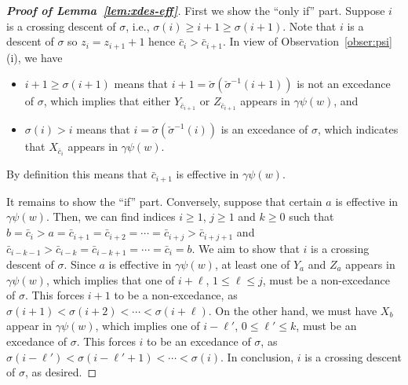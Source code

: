 \documentclass[12pt]{amsart}
\numberwithin{equation}{section}
\theoremstyle{plain}
\theoremstyle{definition}
\begin{document}
\begin{proof}[{\bf Proof of Lemma~\ref{lem:xdes-eff}}]
First we show the  ``only if'' part. Suppose $i$ is a crossing descent of $\sigma$, i.e., $\sigma(i)\ge i+1\ge \sigma(i+1)$. Note that $i$ is a descent of $\sigma$ so $z_i=z_{i+1}+1$ hence $\bar c_i>\bar c_{i+1}$. In view of  Observation~\ref{obser:psi} (i),  we have 
\begin{itemize}
\item $i+1\ge \sigma(i+1)$ means that $i+1=\check\sigma(\check\sigma^{-1}(i+1))$ is not an excedance of $\sigma$, which implies that either $Y_{\bar c_{i+1}}$ or $Z_{\bar c_{i+1}}$ appears in $\gamma\psi(w)$, and
\item $\sigma(i)>i$ means that $i=\check\sigma(\check\sigma^{-1}(i))$ is an excedance of $\sigma$, which indicates that $X_{\bar c_i}$  appears in $\gamma\psi(w)$. 
\end{itemize}
By definition this means that $\bar c_{i+1}$ is effective in $\gamma\psi(w)$.

It remains to show the ``if'' part. Conversely, suppose that certain  $a$  is effective in $\gamma\psi(w)$. Then, we can find indices $i\geq1$, $j\geq1$ and $k\geq0$ such that  $b=\bar c_i>a=\bar c_{i+1}=\bar c_{i+2}=\cdots=\bar c_{i+j}>\bar c_{i+j+1}$ and $\bar c_{i-k-1}>\bar c_{i-k}=\bar c_{i-k+1}=\cdots=\bar c_i=b$.  We aim to show that $i$ is a crossing descent of $\sigma$. Since $a$ is effective in $\gamma\psi(w)$, at least one of $Y_a$ and $Z_a$ appears in $\gamma\psi(w)$, which implies that one of $i+\ell$, $1\leq \ell\leq j$, must be a non-excedance of $\sigma$. This forces $i+1$ to be a non-excedance, as $\sigma(i+1)<\sigma(i+2)<\cdots<\sigma(i+\ell)$. On the other hand, we must have $X_b$ appear in $\gamma\psi(w)$, which implies one of $i-\ell'$, $0\leq \ell'\leq k$, must be an excedance of $\sigma$.
This forces $i$ to be an excedance of $\sigma$, as $\sigma(i-\ell')<\sigma(i-\ell'+1)<\cdots<\sigma(i)$. 
In conclusion, $i$ is a crossing descent of $\sigma$, as desired. 

\end{proof}
\end{document}
